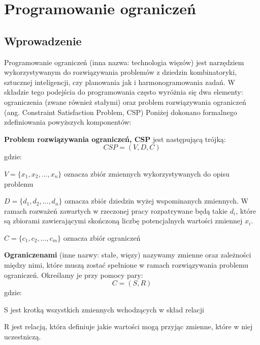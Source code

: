 \chapter{Programowanie ograniczeń}
\thispagestyle{chapterBeginStyle}

\section{Wprowadzenie}
    Programowanie ograniczeń (inna nazwa: technologia więzów) jest narzędziem wykorzystywanym do rozwiązywania 
    problemów z dziedzin kombinatoryki, sztucznej inteligencji, czy planowania jak i harmonogramowania zadań.
    W składzie tego podejścia do programowania często wyróżnia się dwa elementy: ograniczenia (zwane również
    stałymi) oraz problem rozwiązywania ograniczeń (ang. Constraint Satisfaction Problem, CSP)
    Poniżej dokonano formalnego zdefiniowania powyższych komponentów:
    \begin{definition}
        \label{ConstraintProblem}
        \textbf{Problem rozwiązywania ograniczeń, CSP} jest następującą trójką:
        \begin{equation}
            CSP = (V,D,C)
        \end{equation}
        gdzie:

        $V = \{x_{1},x_{2},...,x_{n}\}$ oznacza zbiór zmiennych wykorzystywanych do opisu problemu

        $D = \{d_{1},d_{2},...,d_{n}\}$ oznacza zbiór dziedzin wyżej wspominanych zmiennych. W ramach 
        rozważeń zawartych w rzeczonej pracy rozpatrywane będą takie $d_{i}$, które są zbiorami zawierającymi 
        skończoną liczbę potencjalnych wartości zmiennej $x_{i}$.

        $C = \{c_{1},c_{2},...,c_{m}\}$ oznacza zbiór ograniczeń
    \end{definition}
    \begin{definition}
        \label{Constraint}
        \textbf{Ograniczenami} (inne nazwy: stałe, więzy) nazywamy zmienne oraz zależności między nimi, które muszą zostać spełnione 
        w ramach rozwiązywania problemu ograniczeń. Określamy je przy pomocy pary: 
        \begin{equation}
            C = (S,R)
        \end{equation}
        gdzie:

        S jest krotką wszystkich zmiennych wchodzących w skład relacji 

        R jest relacją, która definiuje jakie wartości mogą przyjąc zmienne, które w niej uczestniczą.
    \end{definition}
